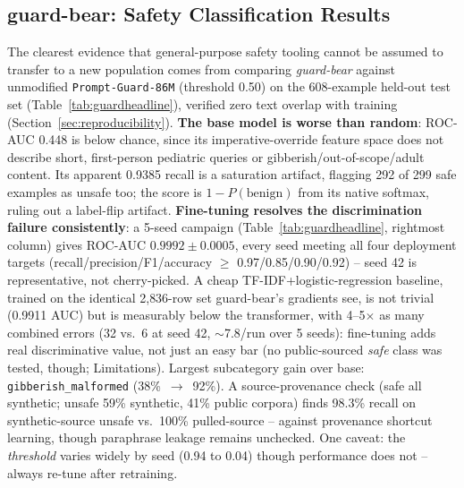 \documentclass[pdflatex,sn-mathphys-num]{sn-jnl-official}%
\begin{document}
\subsection{guard-bear: Safety Classification Results}\label{sec:guardresults}

The clearest evidence that general-purpose safety tooling cannot be assumed to transfer to a new population comes from comparing \textit{guard-bear} against unmodified \texttt{Prompt-Guard-86M} (threshold 0.50) on the 608-example held-out test set (Table~\ref{tab:guardheadline}), verified zero text overlap with training (Section~\ref{sec:reproducibility}). \textbf{The base model is worse than random}: ROC-AUC 0.448 is below chance, since its imperative-override feature space does not describe short, first-person pediatric queries or gibberish/out-of-scope/adult content. Its apparent 0.9385 recall is a saturation artifact, flagging 292 of 299 safe examples as unsafe too; the score is $1-P(\text{benign})$ from its native softmax, ruling out a label-flip artifact. \textbf{Fine-tuning resolves the discrimination failure consistently}: a 5-seed campaign (Table~\ref{tab:guardheadline}, rightmost column) gives ROC-AUC $0.9992\pm0.0005$, every seed meeting all four deployment targets (recall/precision/F1/accuracy $\geq$ 0.97/0.85/0.90/0.92) -- seed 42 is representative, not cherry-picked. A cheap TF-IDF+logistic-regression baseline, trained on the identical 2{,}836-row set guard-bear's gradients see, is not trivial (0.9911 AUC) but is measurably below the transformer, with 4--5$\times$ as many combined errors (32 vs.\ 6 at seed 42, $\sim$7.8/run over 5 seeds): fine-tuning adds real discriminative value, not just an easy bar (no public-sourced \emph{safe} class was tested, though; Limitations). Largest subcategory gain over base: \texttt{gibberish\_malformed} (38\%~$\to$~92\%). A source-provenance check (safe all synthetic; unsafe 59\% synthetic, 41\% public corpora) finds 98.3\% recall on synthetic-source unsafe vs.\ 100\% pulled-source -- against provenance shortcut learning, though paraphrase leakage remains unchecked. One caveat: the \emph{threshold} varies widely by seed (0.94 to 0.04) though performance does not -- always re-tune after retraining.
\end{document}

